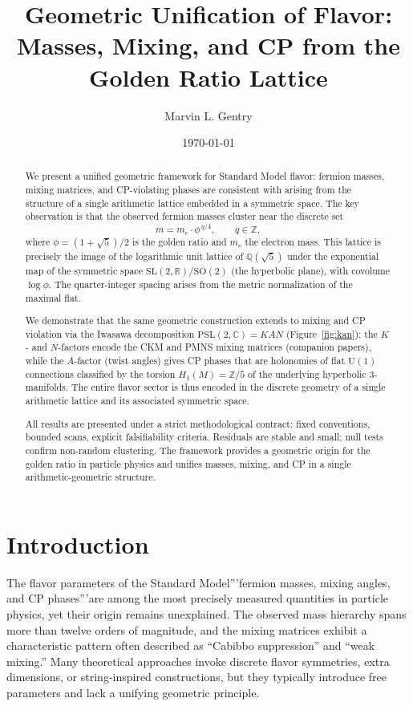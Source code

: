 ﻿\documentclass[12pt]{article}
\title{Geometric Unification of Flavor:\\ Masses, Mixing, and CP from the Golden Ratio Lattice}
\author[1]{Marvin L. Gentry}
\affil[1]{Independent Researcher, \texttt{drmlgentry@protonmail.com} \\ ORCID: 0009-0006-4550-2663}
\date{\today}
\theoremstyle{definition}
\begin{document}
\maketitle

\begin{abstract}
We present a unified geometric framework for Standard Model flavor: fermion masses, mixing matrices, and CP-violating phases are consistent with arising from the structure of a single arithmetic lattice embedded in a symmetric space. The key observation is that the observed fermion masses cluster near the discrete set
\[
m = m_e \cdot \phi^{\,q/4}, \qquad q\in\mathbb{Z},
\]
where $\phi = (1+\sqrt5)/2$ is the golden ratio and $m_e$ the electron mass. This lattice is precisely the image of the logarithmic unit lattice of $\mathbb{Q}(\sqrt5)$ under the exponential map of the symmetric space $\mathrm{SL}(2,\mathbb{R})/\mathrm{SO}(2)$ (the hyperbolic plane), with covolume $\log\phi$. The quarter-integer spacing arises from the metric normalization of the maximal flat.

We demonstrate that the same geometric construction extends to mixing and CP violation via the Iwasawa decomposition $\mathrm{PSL}(2,\mathbb{C}) = KAN$ (Figure~\ref{fig:kan}): the $K$- and $N$-factors encode the CKM and PMNS mixing matrices (companion papers), while the $A$-factor (twist angles) gives CP phases that are holonomies of flat $\mathrm{U}(1)$ connections classified by the torsion $H_1(M)=\mathbb{Z}/5$ of the underlying hyperbolic 3-manifolds. The entire flavor sector is thus encoded in the discrete geometry of a single arithmetic lattice and its associated symmetric space.

All results are presented under a strict methodological contract: fixed conventions, bounded scans, explicit falsifiability criteria. Residuals are stable and small; null tests confirm non-random clustering. The framework provides a geometric origin for the golden ratio in particle physics and unifies masses, mixing, and CP in a single arithmetic-geometric structure.
\end{abstract}

\section{Introduction}
\label{sec:intro}

The flavor parameters of the Standard Model'''fermion masses, mixing angles, and CP phases'''are among the most precisely measured quantities in particle physics, yet their origin remains unexplained. The observed mass hierarchy spans more than twelve orders of magnitude, and the mixing matrices exhibit a characteristic pattern often described as ``Cabibbo suppression'' and ``weak mixing.'' Many theoretical approaches invoke discrete flavor symmetries, extra dimensions, or string-inspired constructions, but they typically introduce free parameters and lack a unifying geometric principle.
\end{document}
